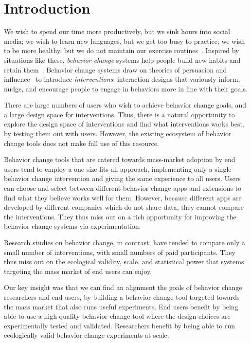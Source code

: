 \chapter{Introduction}

We wish to spend our time more productively, but we sink hours into social media; we wish to learn new languages, but we get too busy to practice; we wish to be more healthy, but we do not maintain our exercise routines~\cite{consolvo2009theory}. Inspired by situations like these, \textit{behavior change} systems help people build new habits and retain them~\cite{consolvo2008activity,froehlich2009ubigreen,kay2012lullaby,kim2016timeaware}. Behavior change systems draw on theories of persuasion and influence~\cite{fogg2002persuasive,cialdini1987influence} to introduce \textit{interventions}: interaction designs that variously inform, nudge, and encourage people to engage in behaviors more in line with their goals.

There are large numbers of users who wish to achieve behavior change goals, and a large design space for interventions. Thus, there is a natural opportunity to explore the design space of interventions and find what interventions works best, by testing them out with users. However, the existing ecosystem of behavior change tools does not make full use of this resource.

Behavior change tools that are catered towards mass-market adoption by end users tend to employ a one-size-fits-all approach, implementing only a single behavior change intervention and giving the same experience to all users. Users can choose and select between different behavior change apps and extensions to find what they believe works well for them. However, because different apps are developed by different companies which do not share data, they cannot compare the interventions. They thus miss out on a rich opportunity for improving the behavior change systems via experimentation.

Research studies on behavior change, in contrast, have tended to compare only a small number of interventions, with small numbers of paid participants. They thus miss out on the ecological validity, scale, and statistical power that systems targeting the mass market of end users can enjoy.

Our key insight was that we can find an alignment the goals of behavior change researchers and end users, by building a behavior change tool targeted towards the mass market that also runs useful experiments. End users benefit by being able to use a high-quality behavior change tool where the design choices are experimentally tested and validated. Researchers benefit by being able to run ecologically valid behavior change experiments at scale.

